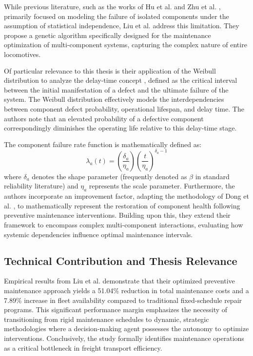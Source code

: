 \documentclass[a4paper]{scrartcl}
\begin{document}
While previous literature, such as the works of Hu et al. \cite{Huetal2021} and Zhu et al. \cite{Zhuetal2021}, primarily focused on modeling the failure of isolated components under the assumption of statistical independence, Liu et al. address this limitation. They propose a genetic algorithm specifically designed for the maintenance optimization of multi-component systems, capturing the complex nature of entire locomotives.

Of particular relevance to this thesis is their application of the Weibull distribution to analyze the delay-time concept , defined as the critical interval between the initial manifestation of a defect and the ultimate failure of the system. The Weibull distribution effectively models the interdependencies between component defect probability, operational lifespan, and delay time. The authors note that an elevated probability of a defective component correspondingly diminishes the operating life relative to this delay-time stage. 

The component failure rate function is mathematically defined as:
\begin{equation}
\lambda_a(t) = \left(\frac{\delta_a}{\eta_a}\right)\left(\frac{t}{\eta_a}\right)^{\delta_a-1}
\end{equation}
where $\delta_a$ denotes the shape parameter (frequently denoted as $\beta$ in standard reliability literature) and $\eta_a$ represents the scale parameter. Furthermore, the authors incorporate an improvement factor, adapting the methodology of Dong et al. \cite{Dongetal2020}, to mathematically represent the restoration of component health following preventive maintenance interventions. Building upon this, they extend their framework to encompass complex multi-component interactions, evaluating how systemic dependencies influence optimal maintenance intervals.

\subsection*{Technical Contribution and Thesis Relevance}

Empirical results from Liu et al. demonstrate that their optimized preventive maintenance approach yields a 51.04\% reduction in total maintenance costs and a 7.89\% increase in fleet availability compared to traditional fixed-schedule repair programs. This significant performance margin emphasizes the necessity of transitioning from rigid maintenance schedules to dynamic, strategic methodologies where a decision-making agent possesses the autonomy to optimize interventions. Conclusively, the study formally identifies maintenance operations as a critical bottleneck in freight transport efficiency.
\end{document}
